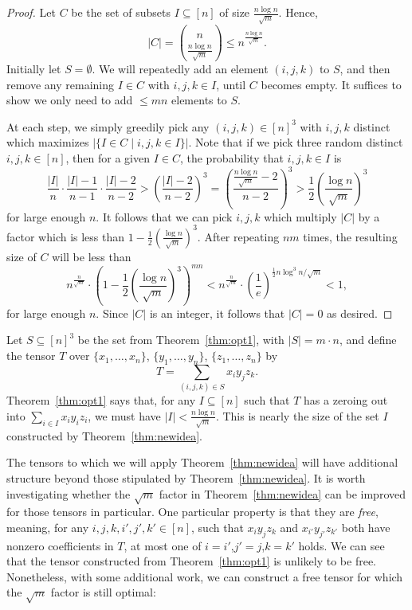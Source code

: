 \documentclass{theoretics}
\begin{document}
\begin{proof}
Let $C$ be the set of subsets $I \subseteq [n]$ of size $\frac{n \log n}{\sqrt{m}}$. Hence, $$|C| = \binom{n}{\frac{n \log n}{\sqrt{m}}} \leq n^{\frac{n \log n}{\sqrt{m}}}.$$ Initially let $S = \emptyset$. We will repeatedly add an element $(i,j,k)$ to $S$, and then remove any remaining $I \in C$ with $i,j,k \in I$, until $C$ becomes empty. It suffices to show we only need to add $\leq mn$ elements to $S$.
 
At each step, we simply greedily pick any $(i,j,k) \in [n]^3$ with $i,j,k$ distinct which maximizes $|\{ I \in C \mid i,j,k \in I \}|$. Note that if we pick three random distinct $i,j,k \in [n]$, then for a given $I \in C$, the probability that $i,j,k \in I$ is $$\frac{|I|}{n} \cdot \frac{|I|-1}{n-1} \cdot \frac{|I|-2}{n-2} > \left( \frac{|I|-2}{n-2} \right)^3 = \left( \frac{\frac{n \log n}{\sqrt{m}}-2}{n-2} \right)^3 > \frac12 \left( \frac{\log n}{\sqrt{m}} \right)^3$$ for large enough $n$. It follows that we can pick $i,j,k$ which multiply $|C|$ by a factor which is less than $1 - \frac12 \left( \frac{ \log n}{\sqrt{m}} \right)^3$. After repeating $nm$ times, the resulting size of $C$ will be less than 
$$n^{\frac{n}{\sqrt{m}}} \cdot \left( 1 - \frac12 \left( \frac{\log n}{\sqrt{m}} \right)^3 \right)^{mn} < n^{\frac{n}{\sqrt{m}}} \cdot \left( \frac{1}{e} \right)^{\frac12 n \log^3 n / \sqrt{m}} < 1,$$ for large enough $n$. Since $|C|$ is an integer, it follows that $|C|=0$ as desired.
\end{proof}


Let $S \subseteq [n]^3$ be the set from Theorem~\ref{thm:opt1}, with $|S| = m \cdot n$, and define the tensor $T$ over $\{x_1, \ldots, x_n\}$, $\{y_1, \ldots, y_n\}$, $\{z_1, \ldots, z_n\}$ by $$T = \sum_{(i,j,k) \in S} x_i y_j z_k.$$ Theorem~\ref{thm:opt1} says that, for any $I \subseteq [n]$ such that $T$ has a zeroing out into $\sum_{i \in I} x_iy_iz_i$, we must have $|I| < \frac{n \log n}{\sqrt{m}}$. This is nearly the size of the set $I$ constructed by Theorem~\ref{thm:newidea}.

The tensors to which we will apply Theorem~\ref{thm:newidea} will have additional structure beyond those stipulated by Theorem~\ref{thm:newidea}. It is worth investigating whether the $\sqrt{m}$ factor in Theorem~\ref{thm:newidea} can be improved for those tensors in particular. One particular property is that they are \emph{free}, meaning, for any $i,j,k,i',j',k' \in [n]$, such that $x_i y_j z_k$ and $x_{i'}y_{j'}z_{k'}$ both have nonzero coefficients in $T$, at most one of $i=i'$,$j'=j$,$k=k'$ holds. We can see that the tensor constructed from Theorem~\ref{thm:opt1} is unlikely to be free. Nonetheless, with some additional work, we can construct a free tensor for which the $\sqrt{m}$ factor is still optimal:
\end{document}
